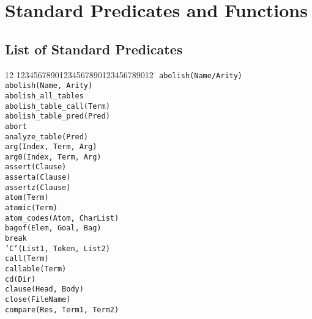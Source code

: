 \chapter{Standard Predicates and Functions} \label{standard_predicates}


\section{List of Standard Predicates}
\begin{tabbing}
12 \= 12345678901234567890123456789012 \=	\kill
 \> {\tt abolish(Name/Arity)}	\>					\\
 \> {\tt abolish(Name, Arity)}	\>					\\
 \> {\tt abolish\_all\_tables}	\>					\\
 \> {\tt abolish\_table\_call(Term)} \>					\\
 \> {\tt abolish\_table\_pred(Pred)} \>					\\
 \> {\tt abort}			\>					\\
 \> {\tt analyze\_table(Pred)}	\>					\\
 \> {\tt arg(Index, Term, Arg)}	\>					\\
 \> {\tt arg0(Index, Term, Arg)}\>					\\
 \> {\tt assert(Clause)}	\>					\\
 \> {\tt asserta(Clause)}	\>					\\
 \> {\tt assertz(Clause)}	\>					\\
 \> {\tt atom(Term)}		\>					\\
 \> {\tt atomic(Term)}		\>					\\
 \> {\tt atom\_codes(Atom, CharList)}	\>				\\
 \> {\tt bagof(Elem, Goal, Bag)}\>					\\
 \> {\tt break}			\>					\\
 \> {\tt 'C'(List1, Token, List2)} \>					\\
 \> {\tt call(Term)}		\>					\\
 \> {\tt callable(Term)}	\>					\\
 \> {\tt cd(Dir)}		\>					\\
 \> {\tt clause(Head, Body)}	\>					\\
 \> {\tt close(FileName)}	\>					\\
 \> {\tt compare(Res, Term1, Term2)} \>					\\

\end{tabbing}
